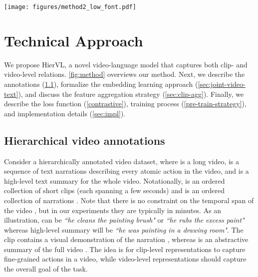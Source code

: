 \documentclass[10pt,twocolumn,letterpaper]{article}
\newcommand{\modelname}[0]{{HierVL}}
\begin{document}
\begin{figure*}[t]
\centering
\texttt{[image: figures/method2\_low\_font.pdf]}
\caption{Schematic representation of our proposed approach. In the clip-level contrastive learning setup (top), we match video clips with their corresponding narrations. The selected clips in one batch are from different videos, as shown. In our novel parent-level contrastive learning setup (bottom), we sample short-term features and aggregate them into a long-term representation followed by contrastive matching with the summary feature. These clips are sampled from the same video. Note that  and  are common in both stages, and also trainable in both. (For simplicity, figure only shows positive pairs in the contrastive setup.)}
\label{fig:method}
\vspace{-0.10in}
\end{figure*}

\section{Technical Approach}
\label{sec:method}

We propose \modelname, a novel video-language model that captures both clip- and video-level relations. \cref{fig:method} overviews our method. Next, we describe the annotations (\cref{sec:video-annotations}), formalize the embedding learning approach (\cref{sec:joint-video-text}), and discuss the feature aggregation strategy (\cref{sec:clip-agg}).  
Finally, we describe the loss function (\cref{contrastive}), 
training process (\cref{pre-train-strategy}), and implementation details (\cref{sec:impl}).

\subsection{Hierarchical video annotations} 
\label{sec:video-annotations}

Consider a hierarchically annotated video dataset,  where  is a long video,  is a sequence of text narrations describing every atomic action in the video, and  is a high-level text summary for the whole video. Notationally,  is an ordered collection of short clips  (each spanning a few seconds) and  is an ordered collection of narrations . 
Note that there is no constraint on the temporal span of the video , but in our experiments they are
typically in minutes. As an illustration,  can be \textit{``he cleans the painting brush"} or \textit{``he rubs the excess paint"} whereas high-level summary  will be \textit{``he was painting in a drawing room"}. The clip  contains a visual demonstration of the narration , whereas  is an abstractive summary of the full video . 
The idea is for clip-level representations to capture fine-grained actions in a video, while video-level representations should capture the overall goal of the task.
\end{document}
